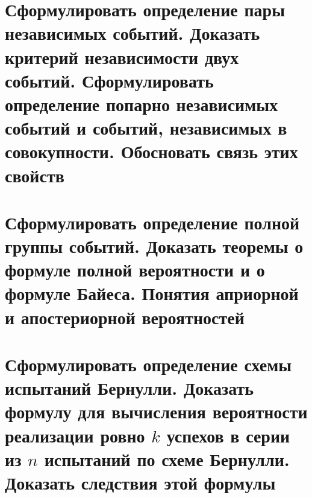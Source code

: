 \documentclass[a4paper]{report}
\begin{document}
\section{Сформулировать определение пары независимых событий.
Доказать критерий независимости двух событий.
Сформулировать определение попарно независимых событий и событий, независимых в совокупности.
Обосновать связь этих свойств}

\section{Сформулировать определение полной группы событий.
Доказать теоремы о формуле полной вероятности и о формуле Байеса.
Понятия априорной и апостериорной вероятностей}

\section{Сформулировать определение схемы испытаний Бернулли.
Доказать формулу для вычисления вероятности реализации ровно $k$ успехов в серии из $n$ испытаний по схеме Бернулли.
Доказать следствия этой формулы}
\end{document}
